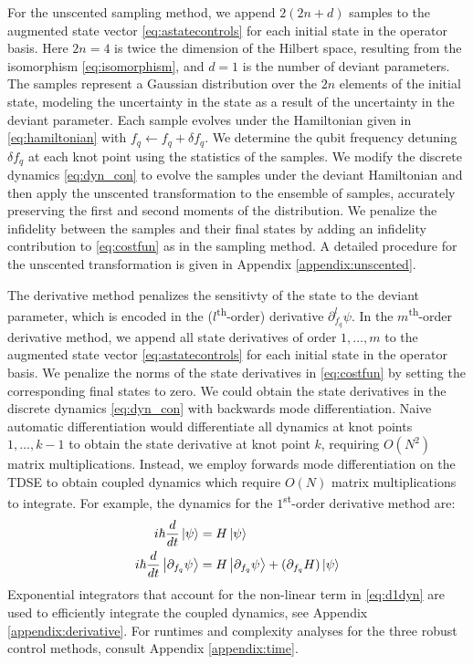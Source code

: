 For the unscented sampling method, we append $2(2n + d)$ samples
to the augmented state vector \eqref{eq:astatecontrols}
for each initial state in the operator basis. Here $2n = 4$ is twice the
dimension of the Hilbert space, resulting from the isomorphism \eqref{eq:isomorphism},
and $d = 1$ is the number of deviant parameters. The samples
represent a Gaussian distribution over the $2n$
elements of the initial state, modeling
the uncertainty in the state as a result of the uncertainty in
the deviant parameter. Each sample evolves under the Hamiltonian
given in \eqref{eq:hamiltonian} with $f_{q} \gets f_{q} + \delta f_{q}$.
We determine the qubit frequency detuning $\delta f_{q}$
at each knot point using the statistics of the samples.
We modify the discrete dynamics \eqref{eq:dyn_con} to
evolve the samples under the deviant Hamiltonian
and then apply the unscented transformation to the ensemble
of samples,
accurately preserving the first and second moments
of the distribution.
We penalize the infidelity between the samples and their final states
by adding an infidelity contribution to \eqref{eq:costfun}
as in the sampling method.
A detailed procedure for the unscented transformation is given
in Appendix \ref{appendix:unscented}.

The derivative method penalizes the sensitivty of the state
to the deviant parameter, which is encoded in the ($l$\textsuperscript{th}-order)
derivative $\partial_{f_{q}}^{l} \psi$. In the $m$\textsuperscript{th}-order
derivative method, we append all state derivatives of order $1, \dots, m$
to the augmented state vector \eqref{eq:astatecontrols}
for each initial state in the operator basis.
We penalize the norms of the state derivatives
in \eqref{eq:costfun} by setting the corresponding final states to zero.
We could obtain the state derivatives in the discrete dynamics \eqref{eq:dyn_con}
with backwards mode differentiation.
Naive automatic differentiation 
would differentiate all dynamics at knot points
$1, \dots, k - 1$ to obtain the state derivative at knot point $k$, requiring
$O(N^{2})$ matrix multiplications. Instead, we 
employ forwards mode differentiation on the TDSE to obtain coupled dynamics
which require $O(N)$ matrix multiplications to integrate.
For example, the dynamics for the $1$\textsuperscript{st}-order derivative method are:
\begin{align}
  i \hbar \frac{d}{dt} \ket{\psi} &= H \ket{\psi}\\
  i \hbar \frac{d}{dt} \ket{\partial_{f_{q}}\psi} &=
  H \ket{\partial_{f_{q}} \psi} +
  (\partial_{f_{q}} H) \ket{\psi}
  \label{eq:d1dyn}
\end{align}
Exponential integrators that account for the non-linear
term in \eqref{eq:d1dyn} are used to efficiently integrate the coupled dynamics,
see Appendix \ref{appendix:derivative}. For runtimes
and complexity analyses for the three robust control methods,
consult Appendix \ref{appendix:time}.

